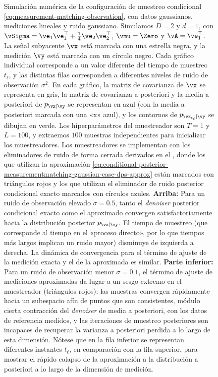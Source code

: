 \documentclass[../../book-main_es.tex]{subfiles}
\begin{document}
\begin{figure}[tbp]
    \caption{Simulación numérica de la configuración de muestreo condicional
        \eqref{eq:measurement-matching-observation}, con datos gaussianos, mediciones lineales
        y ruido gaussiano. Simulamos $D=2$ y
        $d=1$, con $\vSigma
        = \ve_1 \ve_1^\top + \tfrac{1}{4} \ve_2 \ve_2^\top$, $\vmu = \Zero$ y
        $\vA = \ve_1^\top$. La señal subyacente $\vx$ está marcada
        con una estrella negra,
        y la medición $\vy$ está marcada con un círculo negro.
        Cada gráfico individual corresponde a un valor diferente del tiempo de muestreo
        $t_{\ell}$, y las distintas filas corresponden a diferentes
        niveles de ruido de observación
        $\sigma^2$.
        En cada gráfico, la matriz de covarianza de $\vx$ se representa en gris, la
        matriz de covarianza a posteriori y la media a posteriori de $p_{\vx \mid \vy}$ se
        representan en azul (con la media a posteriori marcada con una «x» azul), y
        los contornos de $p_{\vx_{t_{\ell}} \mid \vy}$ se dibujan en
        verde. Los hiperparámetros
        del muestreador son $T=1$ y $L=100$, y extraemos $100$
        muestras independientes para inicializar los muestreadores. Los muestreadores se implementan
        con los eliminadores de ruido de forma cerrada derivados en el
        , donde los que utilizan la aproximación 
        \eqref{eq:conditional-posterior-measurementmatching-gaussian-case-dps-approx}
        están marcados con triángulos rojos y los que utilizan el eliminador de ruido
        posterior condicional exacto marcados con círculos azules.
        \textbf{Arriba:} Para un ruido de observación elevado $\sigma = 0.5$, tanto el
        \textit{denoiser} posterior condicional exacto como el aproximado
        convergen satisfactoriamente hacia la distribución posterior $p_{\vx \mid \vy}$. El tiempo de muestreo
        (que corresponde
        al tiempo en el «proceso directo», por lo que tiempos más largos implican un ruido mayor)
        disminuye de izquierda a derecha. La dinámica de convergencia para
        el término de ajuste de la medición exacta y
        el de la aproximada es similar. \textbf{Parte inferior:} Para
        un ruido de observación menor $\sigma = 0.1$, el
        término de ajuste de mediciones aproximadas da lugar a un sesgo extremo
        en el muestreador
        (triángulos rojos): las muestras convergen rápidamente hacia un subespacio afín
        de puntos que son consistentes, módulo cierta contracción del
        \textit{denoiser} de media a posteriori,
        con los datos de referencia medidos, y las iteraciones de muestreo posteriores
        son
        incapaces de recuperar la varianza a posteriori perdida a lo largo de esta dimensión. Nótese
        que en la fila inferior se representan diferentes instantes $t_{\ell}$,
        en comparación con
        la fila superior, para mostrar el rápido colapso de la aproximación a la
    distribución a posteriori a lo largo de la dimensión de medición.}
    \label{fig:conditional_sampling_computational_gaussian}
\end{figure}
\end{document}
